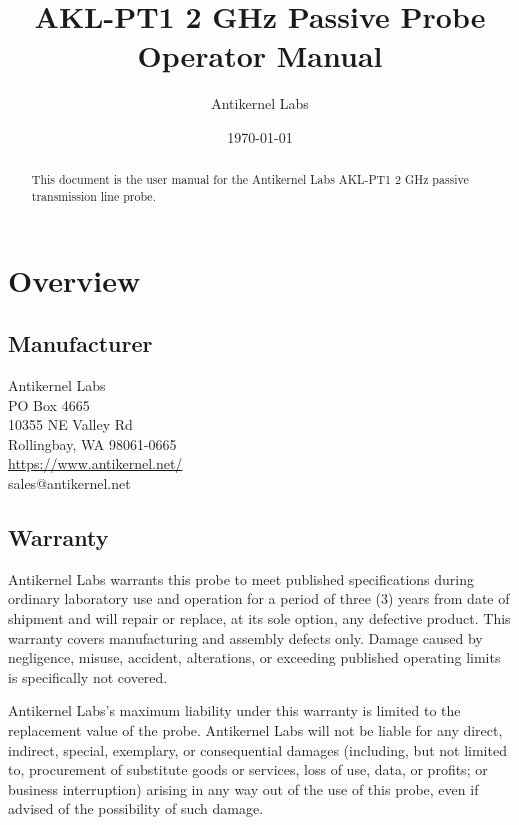 \documentclass[11pt]{article}
\begin{document}
\title{AKL-PT1 2 GHz Passive Probe Operator Manual}
\author{Antikernel Labs}
\date{\today}

\maketitle
\begin{abstract} \normalsize
This document is the user manual for the Antikernel Labs AKL-PT1 2 GHz passive transmission line probe.
\end{abstract}
\thispagestyle{empty}

\pagebreak

\tableofcontents

\pagebreak

\section{Overview}

\subsection{Manufacturer}
Antikernel Labs \\
PO Box 4665 \\
10355 NE Valley Rd \\
Rollingbay, WA 98061-0665 \\
\url{https://www.antikernel.net/} \\
sales@antikernel.net \\

\subsection{Warranty}

Antikernel Labs warrants this probe to meet published specifications during ordinary laboratory use and operation for a
period of three (3) years from date of shipment and will repair or replace, at its sole option, any defective product.
This warranty covers manufacturing and assembly defects only. Damage caused by negligence, misuse, accident,
alterations, or exceeding published operating limits is specifically not covered.

Antikernel Labs's maximum liability under this warranty is limited to the replacement value of the probe. Antikernel
Labs will not be liable for any direct, indirect, special, exemplary, or consequential damages (including, but not
limited to, procurement of substitute goods or services, loss of use, data, or profits; or business interruption)
arising in any way out of the use of this probe, even if advised of the possibility of such damage.
\end{document}

